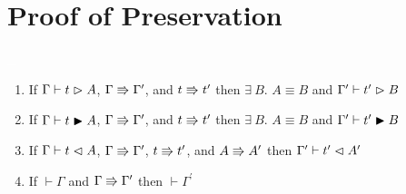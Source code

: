 \chapter{Proof of Preservation}
\label{ap:b}

\begin{lemma}
    \textcolor{white}{\_}
    \begin{enumerate}
        \item If $\Gamma \vdash t \vartriangleright A$, $\Gamma \Rrightarrow \Gamma^\prime$, and $t \Rrightarrow t^\prime$ then $\exists\ B.$ $A \equiv B$ and $\Gamma^\prime \vdash t^\prime \vartriangleright B$
        \item If $\Gamma \vdash t \blacktriangleright A$, $\Gamma \Rrightarrow \Gamma^\prime$, and $t \Rrightarrow t^\prime$ then $\exists\ B.$ $A \equiv B$ and $\Gamma^\prime \vdash t^\prime \blacktriangleright B$
        \item If $\Gamma \vdash t \vartriangleleft A$, $\Gamma \Rrightarrow \Gamma^\prime$, $t \Rrightarrow t^\prime$, and $A \Rrightarrow A^\prime$ then $\Gamma^\prime \vdash t^\prime \vartriangleleft A^\prime$
        \item If $\vdash \Gamma$ and $\Gamma \Rrightarrow \Gamma^\prime$ then $\vdash \Gamma^\prime$
    \end{enumerate}
    \label{lem:b:preservation_par_step}
\end{lemma}
